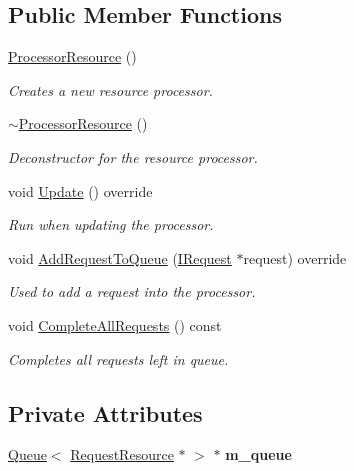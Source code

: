 \subsection*{Public Member Functions}
\begin{DoxyCompactItemize}
\item 
\hyperlink{class_flounder_1_1_processor_resource_a3989a29b7bb72c7c0135fa81cdad5307}{Processor\+Resource} ()
\begin{DoxyCompactList}\small\item\em Creates a new resource processor. \end{DoxyCompactList}\item 
\hyperlink{class_flounder_1_1_processor_resource_ac9179d2ce700b8ce5758284c7ad5e19b}{$\sim$\+Processor\+Resource} ()
\begin{DoxyCompactList}\small\item\em Deconstructor for the resource processor. \end{DoxyCompactList}\item 
void \hyperlink{class_flounder_1_1_processor_resource_a1167c01d0a317a054211972ea32e09cd}{Update} () override
\begin{DoxyCompactList}\small\item\em Run when updating the processor. \end{DoxyCompactList}\item 
void \hyperlink{class_flounder_1_1_processor_resource_afcf217b354213aba94e6288583e88d49}{Add\+Request\+To\+Queue} (\hyperlink{class_flounder_1_1_i_request}{I\+Request} $\ast$request) override
\begin{DoxyCompactList}\small\item\em Used to add a request into the processor. \end{DoxyCompactList}\item 
void \hyperlink{class_flounder_1_1_processor_resource_a5c3075bee60c9a44464d7effbf05da4a}{Complete\+All\+Requests} () const
\begin{DoxyCompactList}\small\item\em Completes all requests left in queue. \end{DoxyCompactList}\end{DoxyCompactItemize}
\subsection*{Private Attributes}
\begin{DoxyCompactItemize}
\item 
\mbox{\label{class_flounder_1_1_processor_resource_a4d88cb5e83e84a9c38ec3a180661c3be}} 
\hyperlink{class_flounder_1_1_queue}{Queue}$<$ \hyperlink{class_flounder_1_1_request_resource}{Request\+Resource} $\ast$ $>$ $\ast$ {\bfseries m\+\_\+queue}
\end{DoxyCompactItemize}
